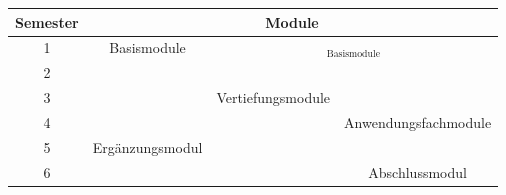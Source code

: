 \begin{center}
\begin{tabular}{|c|c|c|c|}
\hline Semester & \multicolumn{3}{c|}{Module} \\ 
\hline      1 & \multirow{4}{*}{Basismodule} & \multicolumn{2}{c|}{$_{\mbox{Basismodule}}$} \\ 
\cline{1-1} 2 &  &  \multicolumn{2}{c|}{ }  \\
\cline{1-1}\cline{3-4} 3 &  & \multirow{4}{*}{Vertiefungsmodule} &  \\
\cline{1-1} 4 &  & & Anwendungsfachmodule \\
\cline{1-2} 5 & \multirow{2}{*}{Ergänzungsmodul} &  &  \\
\cline{1-1}\cline{4-4} 6 &  &  & Abschlussmodul \\
\hline
\end{tabular}
\end{center}